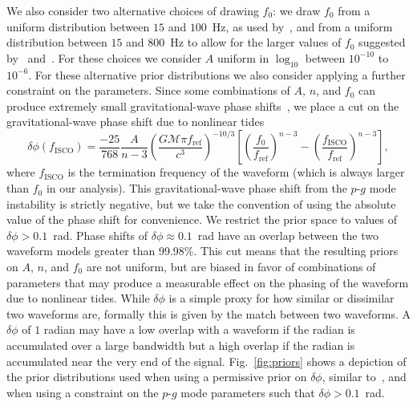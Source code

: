 We also consider two alternative choices of drawing $f_0$: we draw $f_0$ from a uniform distribution between $15$ and $100$~Hz, as used by~\cite{Essick:2016tkn}, and from a uniform distribution between $15$ and $800$~Hz to allow for the larger values of $f_0$ suggested by~\cite{Zhou:2018tvc} and~\cite{Andersson:2017iav}. For these choices we consider $A$ uniform in $\log_{10}$ between $10^{-10}$ to $10^{-6}$. For these alternative prior distributions we also consider applying a further constraint on the parameters. Since some combinations of $A$, $n$, and $f_0$ can produce extremely small gravitational-wave phase shifts~\citep{Essick:2016tkn}, we place a cut on the gravitational-wave phase shift due to nonlinear tides
\begin{equation}
\delta \phi(f_\mathrm{ISCO}) =
                      \frac{-25}{768}  \frac{A}{n-3} \left( \frac{G \mathcal{M} \pi f_{\mathrm{ref}}}{c^3} \right)^{-10/3} \left[ \left( \frac{f_0}{f_{\mathrm{ref}}} \right)^{n-3} - \left(\frac{f_\mathrm{ISCO}}{f_{\mathrm{ref}}} \right)^{n-3} \right],
\end{equation}
where $f_\mathrm{ISCO}$ is the termination frequency of the waveform (which is always larger than $f_0$ in our analysis). This gravitational-wave phase shift from the $p$-$g$ mode instability is strictly negative, but we take the convention of using the absolute value of the phase shift for convenience. We restrict the prior space to values of $\delta \phi > 0.1$~rad. Phase shifts of $\delta \phi \approx 0.1$~rad have an overlap between the two waveform models greater than 99.98\%. This cut means that the resulting priors on $A$, $n$, and $f_0$ are not uniform, but are biased in favor of combinations of parameters that may produce a measurable effect on the phasing of the waveform due to nonlinear tides. While $\delta \phi$ is a simple proxy for how similar or dissimilar two waveforms are, formally this is given by the match between two waveforms. A $\delta \phi$ of $1$ radian may have a low overlap with a waveform if the radian is accumulated over a large bandwidth but a high overlap if the radian is accumulated near the very end of the signal. Fig.~\ref{fig:priors} shows a depiction of the prior distributions used when using a permissive prior on $\delta \phi$, similar to~\cite{abbott2019constraining}, and when using a constraint on the $p$-$g$ mode parameters such that $\delta \phi > 0.1$~rad.


